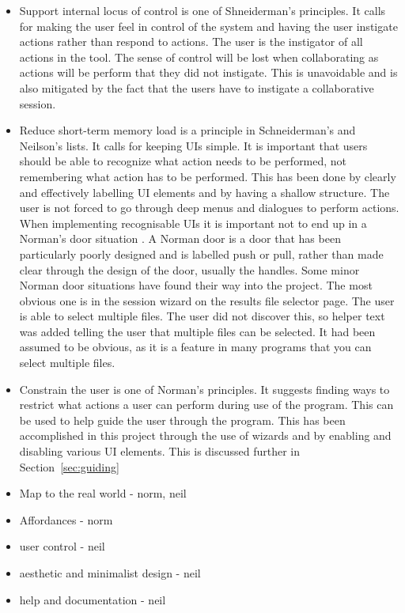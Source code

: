 \begin{itemize}
\item Support internal locus of control is one of Shneiderman's principles.  It calls for making the user feel in control of the system and having the user instigate actions rather than respond to actions.  The user is the instigator of all actions in the tool.  The sense of control will be lost when collaborating as actions will be perform that they did not instigate.  This is unavoidable and is also mitigated by the fact that the users have to instigate a collaborative session.
\item Reduce short-term memory load is a principle in Schneiderman's and Neilson's lists.  It calls for keeping \acp{UI} simple.  It is important that users should be able to recognize what action needs to be performed, not remembering what action has to be performed.  This has been done by clearly and effectively labelling \ac{UI} elements and by having a shallow structure.  The user is not forced to go through deep menus and dialogues to perform actions.  When implementing recognisable \acp{UI} it is important not to end up in a Norman's door situation .  A Norman door is a door that has been particularly poorly designed and is labelled push or pull, rather than made clear through the design of the door, usually the handles.  Some minor Norman door situations have found their way into the project.  The most obvious one is in the session wizard on the results file selector page.  The user is able to select multiple files.  The user did not discover this, so helper text was added telling the user that multiple files can be selected.  It had been assumed to be obvious, as it is a feature in many programs that you can select multiple files.
\item Constrain the user is one of Norman's principles.  It suggests finding ways to restrict what actions a user can perform during use of the program.  This can be used to help guide the user through the program.  This has been accomplished in this project through the use of wizards and by enabling and disabling various \ac{UI} elements.  This is discussed further in Section~\ref{sec:guiding}
\item Map to the real world - norm, neil
\item Affordances - norm
\item user control - neil
\item aesthetic and minimalist design - neil
\item help and documentation - neil
\end{itemize}

